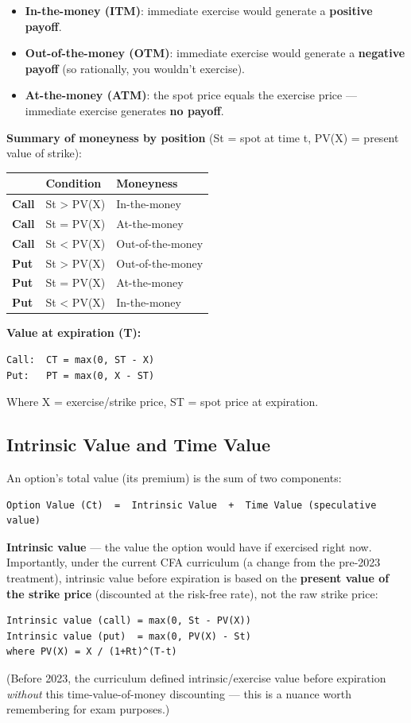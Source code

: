\documentclass[12pt,openany]{book}
\theoremstyle{definition}
\theoremstyle{remark}
\begin{document}
\begin{itemize}
\item \textbf{In-the-money (ITM)}: immediate exercise would generate a \textbf{positive payoff}.
\item \textbf{Out-of-the-money (OTM)}: immediate exercise would generate a \textbf{negative payoff} (so rationally, you wouldn't exercise).
\item \textbf{At-the-money (ATM)}: the spot price equals the exercise price — immediate exercise generates \textbf{no payoff}.
\end{itemize}
\textbf{Summary of moneyness by position} (St = spot at time t, PV(X) = present value of strike):

{\small
\begin{longtable}{@{}L{0.18\textwidth}L{0.34\textwidth}L{0.38\textwidth}@{}}
\toprule
\textbf{} & \textbf{Condition} & \textbf{Moneyness} \\
\midrule
\textbf{Call} & St > PV(X) & In-the-money \\
\textbf{Call} & St = PV(X) & At-the-money \\
\textbf{Call} & St < PV(X) & Out-of-the-money \\
\textbf{Put} & St > PV(X) & Out-of-the-money \\
\textbf{Put} & St = PV(X) & At-the-money \\
\textbf{Put} & St < PV(X) & In-the-money \\
\bottomrule
\end{longtable}
}

\textbf{Value at expiration (T):}
\begin{lstlisting}[style=notesCode]
Call:  CT = max(0, ST - X)
Put:   PT = max(0, X - ST)
\end{lstlisting}
Where X = exercise/strike price, ST = spot price at expiration.

\subsection{Intrinsic Value and Time Value}

An option's total value (its premium) is the sum of two components:
\begin{lstlisting}[style=notesCode]
Option Value (Ct)  =  Intrinsic Value  +  Time Value (speculative value)
\end{lstlisting}

\textbf{Intrinsic value} — the value the option would have if exercised right now. Importantly, under the current CFA curriculum (a change from the pre-2023 treatment), intrinsic value before expiration is based on the \textbf{present value of the strike price} (discounted at the risk-free rate), not the raw strike price:
\begin{lstlisting}[style=notesCode]
Intrinsic value (call) = max(0, St - PV(X))
Intrinsic value (put)  = max(0, PV(X) - St)
where PV(X) = X / (1+Rt)^(T-t)
\end{lstlisting}
(Before 2023, the curriculum defined intrinsic/exercise value before expiration \emph{without} this time-value-of-money discounting — this is a nuance worth remembering for exam purposes.)
\end{document}
